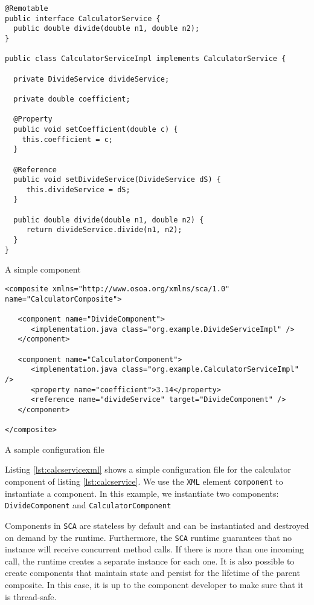 \begin{listing}
\begin{verbatim}
@Remotable
public interface CalculatorService {
  public double divide(double n1, double n2);
}

public class CalculatorServiceImpl implements CalculatorService {

  private DivideService divideService;
  
  private double coefficient;
  
  @Property
  public void setCoefficient(double c) {
    this.coefficient = c;
  }

  @Reference
  public void setDivideService(DivideService dS) {
     this.divideService = dS;
  }

  public double divide(double n1, double n2) {
     return divideService.divide(n1, n2);
  }
}
\end{verbatim}
\caption{A simple component}
\label{lst:calcservice}
\end{listing}
\begin{listing}
\begin{verbatim}
<composite xmlns="http://www.osoa.org/xmlns/sca/1.0" name="CalculatorComposite">

   <component name="DivideComponent">
      <implementation.java class="org.example.DivideServiceImpl" />
   </component>

   <component name="CalculatorComponent">
      <implementation.java class="org.example.CalculatorServiceImpl" />
      <property name="coefficient">3.14</property>
      <reference name="divideService" target="DivideComponent" />
   </component>

</composite>
\end{verbatim}
\caption{A sample configuration file}
\label{lst:calcservicexml}
\end{listing}

Listing \ref{lst:calcservicexml} shows a simple configuration file for the calculator component of listing \ref{lst:calcservice}.
We use the \texttt{XML} element \texttt{component} to instantiate a component. In this example, we instantiate two components:
\texttt{DivideComponent} and \texttt{CalculatorComponent}

Components in \texttt{SCA} are stateless by default and can be instantiated and destroyed on demand by the runtime. Furthermore, the
\texttt{SCA} runtime guarantees that no instance will receive concurrent method calls. If there is more than one incoming call, the
runtime creates a separate instance for each one. It is also possible to create components that maintain state and persist
for the lifetime of the parent composite. In this case, it is up to the component developer to make sure that it is thread-safe.

